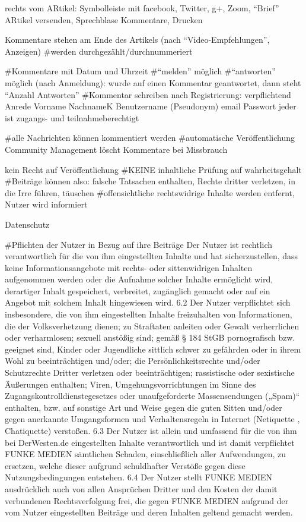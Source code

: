 rechts vom ARtikel: Symbolleiste mit facebook, Twitter, g+, Zoom, ``Brief'' ARtikel versenden, Sprechblase Kommentare, Drucken

Kommentare stehen am Ende des Artikels (nach ``Video-Empfehlungen'', Anzeigen)
#werden durchgezählt/durchnummeriert



#Kommentare mit Datum und Uhrzeit
#``melden'' möglich
#``antworten'' möglich (nach Anmeldung): wurde auf einen Kommentar geantwortet, dann steht ``Anzahl Antworten''
#Kommentar schreiben nach Registrierung:
	verpflichtend
	Anrede
	Vorname
	NachnameK
	Benutzername (Pseudonym)
	email
	Passwort
	jeder ist zugangs- und teilnahmeberechtigt
	

#alle Nachrichten können kommentiert werden 
#automatische Veröffentlichung
Community Management löscht Kommentare bei Missbrauch

kein Recht auf Veröffentlichung
#KEINE inhaltliche Prüfung auf wahrheitsgehalt
#Beiträge können also: falsche Tatsachen enthalten, Rechte dritter verletzen, in die Irre führen, täuschen 
#offensichtliche rechtswidrige Inhalte werden entfernt, Nutzer wird informiert

Datenschutz

#Pflichten der Nutzer in Bezug auf ihre Beiträge
Der Nutzer ist rechtlich verantwortlich für die von ihm eingestellten Inhalte und hat sicherzustellen, dass keine Informationsangebote mit rechts- oder sittenwidrigen Inhalten aufgenommen werden oder die Aufnahme solcher Inhalte ermöglicht wird, derartiger Inhalt gespeichert, verbreitet, zugänglich gemacht oder auf ein Angebot mit solchem Inhalt hingewiesen wird.
6.2 Der Nutzer verpflichtet sich insbesondere, die von ihm eingestellten Inhalte freizuhalten von Informationen, die der Volksverhetzung dienen; zu Straftaten anleiten oder Gewalt verherrlichen oder verharmlosen; sexuell anstößig sind; gemäß § 184 StGB pornografisch bzw. geeignet sind, Kinder oder Jugendliche sittlich schwer zu gefährden oder in ihrem Wohl zu beeinträchtigen und/oder; die Persönlichkeitsrechte und/oder Schutzrechte Dritter verletzen oder beeinträchtigen; rassistische oder sexistische Äußerungen enthalten; Viren, Umgehungsvorrichtungen im Sinne des Zugangskontrolldienstegesetzes oder unaufgeforderte Massensendungen („Spam)“ enthalten, bzw. auf sonstige Art und Weise gegen die guten Sitten und/oder gegen anerkannte Umgangsformen und Verhaltensregeln in Internet (Netiquette , Chatiquette) verstoßen.
6.3 Der Nutzer  ist allein und umfassend für die von ihm bei DerWesten.de eingestellten Inhalte verantwortlich und ist damit verpflichtet FUNKE MEDIEN sämtlichen Schaden, einschließlich aller Aufwendungen, zu ersetzen, welche dieser aufgrund schuldhafter Verstöße gegen diese Nutzungsbedingungen entstehen.
6.4 Der Nutzer stellt FUNKE MEDIEN ausdrücklich auch von allen Ansprüchen Dritter und den Kosten der damit verbundenen Rechtsverfolgung frei, die gegen FUNKE MEDIEN aufgrund der vom Nutzer eingestellten Beiträge und deren Inhalten geltend gemacht werden.

